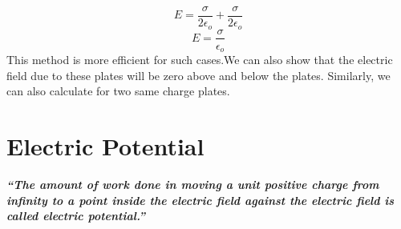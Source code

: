 \begin{equation}
  E = \frac{\sigma}{2\epsilon_{o}} + \frac{\sigma}{2\epsilon_{o}} \nonumber
\end{equation}
\begin{equation}
  E = \frac{\sigma}{\epsilon_{o}} \nonumber
\end{equation}
This method is more efficient for such cases.We can also show that the
electric field due to these plates will be zero above and below the plates.
Similarly, we can also calculate for two same charge plates.

\section{Electric Potential}
\textit{\textbf{“The amount of work done in moving a unit positive charge
from infinity to a point inside the electric field
against the electric field is called electric potential.”}}
